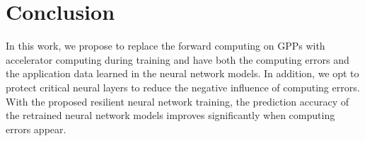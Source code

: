 \section{Conclusion} \label{sec:Conclusion}
In this work, we propose to replace the forward computing on GPPs with accelerator 
computing during training and have both the computing 
errors and the application data learned in the neural network models. 
In addition, we opt to protect critical neural layers to reduce the negative 
influence of computing errors.  
With the proposed resilient neural network training, 
the prediction accuracy of the retrained neural network models improves significantly 
when computing errors appear. 




